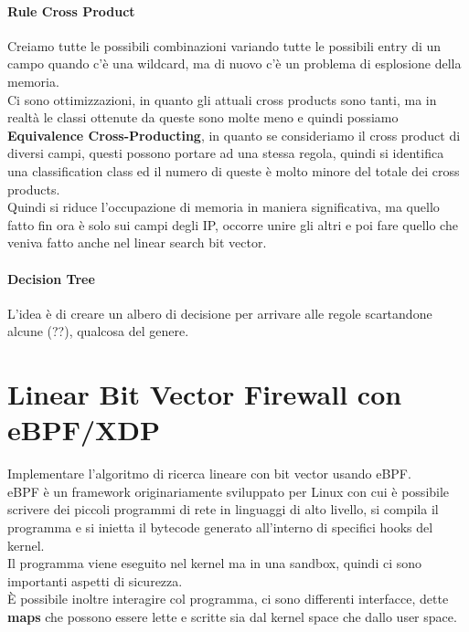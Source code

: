 \documentclass[12pt, oneside]{extbook} %
\begin{document}
\paragraph{Rule Cross Product} Creiamo tutte le possibili combinazioni variando tutte le possibili entry di un campo quando c'è una wildcard, ma di nuovo c'è un problema di esplosione della memoria.
\\Ci sono ottimizzazioni, in quanto gli attuali cross products sono tanti, ma in realtà le classi ottenute da queste sono molte meno e quindi possiamo \textbf{Equivalence Cross-Producting}, in quanto se consideriamo il cross product di diversi campi, questi possono portare ad una stessa regola, quindi si identifica una classification class ed il numero di queste è molto minore del totale dei cross products.
\\Quindi si riduce l'occupazione di memoria in maniera significativa, ma quello fatto fin ora è solo sui campi degli IP, occorre unire gli altri e poi fare quello che veniva fatto anche nel linear search bit vector.\\

\paragraph{Decision Tree}
L'idea è di creare un albero di decisione per arrivare alle regole scartandone alcune (??), qualcosa del genere.

\section{Linear Bit Vector Firewall con eBPF/XDP}
Implementare l'algoritmo di ricerca lineare con bit vector usando eBPF.
\\eBPF è un framework originariamente sviluppato per Linux con cui è possibile scrivere dei piccoli programmi di rete in linguaggi di alto livello, si compila il programma e si inietta il bytecode generato all'interno di specifici hooks del kernel.
\\Il programma viene eseguito nel kernel ma in una sandbox, quindi ci sono importanti aspetti di sicurezza.
\\È possibile inoltre interagire col programma, ci sono differenti interfacce, dette \textbf{maps} che possono essere lette e scritte sia dal kernel space che dallo user space.
\end{document}
